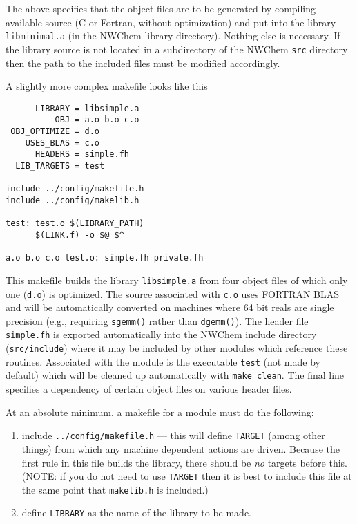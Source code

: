 The above specifies that the object files are to be generated by
compiling available source (C or Fortran, without optimization) and
put into the library {\tt libminimal.a} (in the NWChem library
directory).  Nothing else is necessary.  If the library source is not
located in a subdirectory of the NWChem {\tt src} directory then the
path to the included files must be modified accordingly.

A slightly more complex makefile looks like this
\begin{verbatim}
      LIBRARY = libsimple.a
          OBJ = a.o b.o c.o
 OBJ_OPTIMIZE = d.o
    USES_BLAS = c.o
      HEADERS = simple.fh
  LIB_TARGETS = test

include ../config/makefile.h
include ../config/makelib.h

test: test.o $(LIBRARY_PATH)
      $(LINK.f) -o $@ $^

a.o b.o c.o test.o: simple.fh private.fh
\end{verbatim}

This makefile builds the library {\tt libsimple.a} from four object
files of which only one ({\tt d.o}) is optimized.  The source
associated with {\tt c.o} uses FORTRAN BLAS and will be automatically
converted on machines where 64 bit reals are single precision (e.g.,
requiring {\tt sgemm()} rather than {\tt dgemm()}).  The header file
{\tt simple.fh} is exported automatically into the NWChem include
directory ({\tt src/include}) where it may be included by other
modules which reference these routines.  Associated with the module is
the executable {\tt test} (not made by default) which will be cleaned
up automatically with \verb+make clean+.  The final line
specifies a dependency of certain object files on various header
files.

At an absolute minimum, a makefile for a module must do the following:
\begin{enumerate}
\item include \verb+../config/makefile.h+ --- this will
    define {\tt TARGET} (among other things)
    from which any machine dependent actions are driven.
    Because the first rule in this file
     builds the library, there should be {\em no} targets before this.
    (NOTE: if you do not need to use {\tt TARGET} then it is best to include this
     file at the same point that {\tt makelib.h} is included.)
\item define {\tt LIBRARY} as the name of the library to be made.
\end{enumerate}

